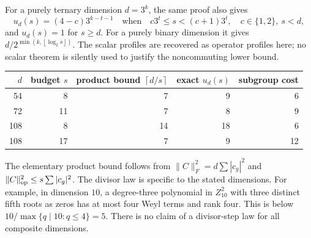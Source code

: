 \documentclass[11pt,a4paper]{article}
\theoremstyle{remark}\newtheorem{remark}[theorem]{Remark}
\newcommand{\fl}[1]{\left\lfloor #1\right\rfloor}
\newcommand{\cl}[1]{\left\lceil #1\right\rceil}
\begin{document}
For a purely ternary dimension $d=3^k$, the same proof also gives
\[
 u_d(s)=(4-c)3^{k-t-1}
 \quad\text{when}\quad c3^t\le s<(c+1)3^t,\quad c\in\{1,2\},\ s<d,
\]
and $u_d(s)=1$ for $s\ge d$. For a purely binary dimension it gives
$d/2^{\min(k,\fl{\log_2s})}$. The scalar profiles are recovered as
operator profiles here; no scalar theorem is silently used to justify
the noncommuting lower bound.

\begin{center}
\begin{tabular}{@{}rrrrr@{}}
\toprule
$d$ & budget $s$ & product bound $\cl{d/s}$ & exact $u_d(s)$ & subgroup cost\\
\midrule
54 & 8 & 7 & 9 & 6\\
72 & 11 & 7 & 8 & 9\\
108 & 8 & 14 & 18 & 6\\
108 & 17 & 7 & 9 & 12\\
\bottomrule
\end{tabular}
\end{center}
The elementary product bound follows from
$\|C\|_F^2=d\sum|c_g|^2$ and
$\|C\|_{\rm op}^2\le s\sum|c_g|^2$.
The divisor law is specific to the stated dimensions. For example,
in dimension $10$, a degree-three polynomial in $Z_{10}^2$ with three
distinct fifth roots as zeros has at most four Weyl terms and rank four.
This is below $10/\max\{q\mid10:q\le4\}=5$. There is no claim of a
divisor-step law for all composite dimensions.
\end{document}

